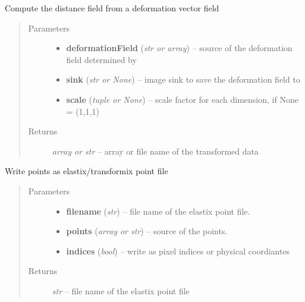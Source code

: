 \documentclass[letterpaper,10pt,english]{sphinxmanual}
\begin{document}
\begin{fulllineitems}
\label{api/ClearMap.Alignment:ClearMap.Alignment.Elastix.deformationDistance}
Compute the distance field from a deformation vector field
\begin{quote}\begin{description}
\item[{Parameters}] \leavevmode\begin{itemize}
\item {} 
\textbf{deformationField} (\emph{str or array}) --
source of the deformation field determined by {\hyperref[api/ClearMap.Alignment:ClearMap.Alignment.Elastix.deformationField]{\emph{}}}

\item {} 
\textbf{sink} (\emph{str or None}) --
image sink to save the deformation field to

\item {} 
\textbf{scale} (\emph{tuple or None}) --
scale factor for each dimension, if None = (1,1,1)

\end{itemize}

\item[{Returns}] \leavevmode
\emph{array or str} --
array or file name of the transformed data

\end{description}\end{quote}

\end{fulllineitems}


\begin{fulllineitems}
\label{api/ClearMap.Alignment:ClearMap.Alignment.Elastix.writePoints}
Write points as elastix/transformix point file
\begin{quote}\begin{description}
\item[{Parameters}] \leavevmode\begin{itemize}
\item {} 
\textbf{filename} (\emph{str}) --
file name of the elastix point file.

\item {} 
\textbf{points} (\emph{array or str}) --
source of the points.

\item {} 
\textbf{indices} (\emph{bool}) --
write as pixel indices or physical coordiantes

\end{itemize}

\item[{Returns}] \leavevmode
\emph{str} --
file name of the elastix point file

\end{description}\end{quote}

\end{fulllineitems}
\end{document}
